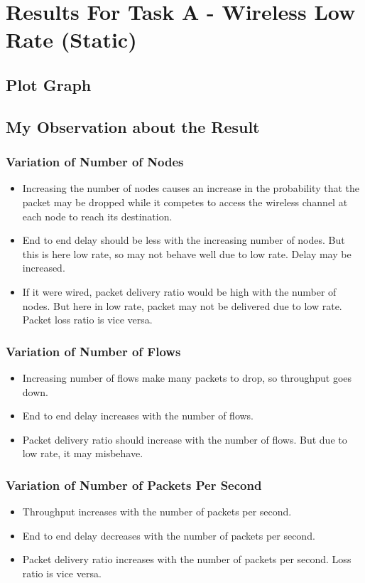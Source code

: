 \documentclass[12pt, a4paper]{article}
\begin{document}
\section{Results For Task A - Wireless Low Rate (Static)}
\subsection{Plot Graph}

\subsection{My Observation about the Result}
\subsubsection{Variation of Number of Nodes}
\begin{itemize}
    \item Increasing the number of nodes causes an increase in the probability that the packet may be dropped while it competes to access the wireless channel at each node to reach its destination.
    \item End to end delay should be less with the increasing number of nodes. But this is here low rate, so may not behave well due to low rate. Delay may be increased.
    \item If it were wired, packet delivery ratio would be high with the number of nodes. But here in low rate, packet may not be delivered due to low rate. Packet loss ratio is vice versa.
\end{itemize}

\subsubsection{Variation of Number of Flows}
\begin{itemize}
    \item Increasing number of flows make many packets to drop, so throughput goes down.
    \item End to end delay increases with the number of flows.
    \item Packet delivery ratio should increase with the number of flows. But due to low rate, it may misbehave.
\end{itemize}
\subsubsection{Variation of Number of Packets Per Second}
\begin{itemize}
    \item Throughput increases with the number of packets per second.
    \item End to end delay decreases with the number of packets per second.
    \item Packet delivery ratio increases with the number of packets per second. Loss ratio is vice versa.
\end{itemize}
\end{document}
